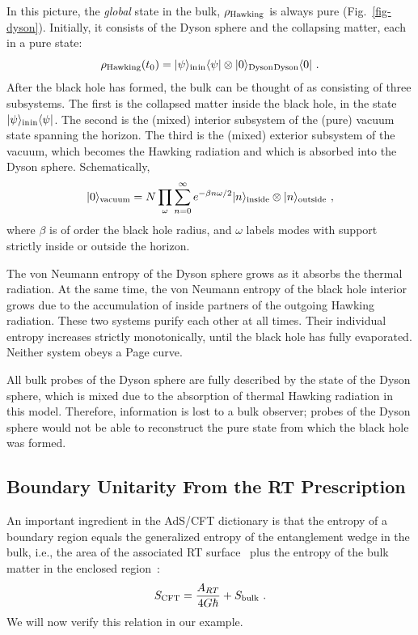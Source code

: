 \documentclass[12pt,letterpaper]{article}
\begin{document}
In this picture, the {\em global}\/ state in the bulk, $\rho_{\rm Hawking}$ is always pure (Fig.~\ref{fig-dyson}). Initially, it consists of the Dyson sphere and the collapsing matter, each in a pure state:
\begin{equation}
  \rho_{\rm Hawking}(t_0) = |\psi\rangle_{\rm in}\mbox{}_{\rm in}\langle\psi| \otimes |0\rangle_{\rm Dyson}\mbox{}_{\rm Dyson}\langle 0|~.
\end{equation}
After the black hole has formed, the bulk can be thought of as consisting of three subsystems. The first is the collapsed matter inside the black hole, in the state $|\psi\rangle_{\rm in}\mbox{}_{\rm in} \langle\psi|$. The second is the (mixed) interior subsystem of the (pure) vacuum state spanning the horizon. The third is the (mixed) exterior subsystem of the vacuum, which becomes the Hawking radiation and which is absorbed into the Dyson sphere. Schematically,
\begin{equation}
  |0\rangle_{\rm vacuum} = N \prod_{\omega} \sum_{n=0}^\infty e^{-\beta n\omega/2} |n\rangle_{\rm inside}\otimes  |n\rangle_{\rm outside}~,
\end{equation}
where $\beta$ is of order the black hole radius, and $\omega$ labels modes with support strictly inside or outside the horizon.

The von Neumann entropy of the Dyson sphere grows as it absorbs the thermal radiation. At the same time, the von Neumann entropy of the black hole interior grows due to the accumulation of inside partners of the outgoing Hawking radiation. These two systems purify each other at all times. Their individual entropy increases strictly monotonically, until the black hole has fully evaporated. Neither system obeys a Page curve.

All bulk probes of the Dyson sphere are fully described by the state of the Dyson sphere, which is mixed due to the absorption of thermal Hawking radiation in this model. Therefore, information is lost to a bulk observer; probes of the Dyson sphere would not be able to reconstruct the pure state from which the black hole was formed. 

\subsection{Boundary Unitarity From the RT Prescription}
\label{sec-success}

An important ingredient in the AdS/CFT dictionary is that the entropy of a boundary region equals the generalized entropy of the entanglement wedge in the bulk, i.e., the area of the associated RT surface~\cite{RyuTak06} plus the entropy of the bulk matter in the enclosed region~\cite{FauLew13,EngWal14}:
\begin{equation}
  S_{\rm CFT} = \frac{A_{RT}}{4G\hbar}+ S_{\rm bulk}~.
  \label{eq-flm}
\end{equation}
We will now verify this relation in our example.
\end{document}
